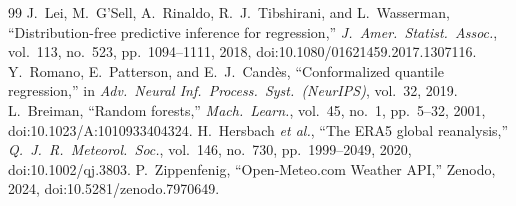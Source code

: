 \documentclass[conference]{IEEEtran}
\begin{document}
\begin{thebibliography}{99}
 J.~Lei, M.~G'Sell, A.~Rinaldo, R.~J.~Tibshirani, and L.~Wasserman, ``Distribution-free predictive inference for regression,'' \emph{J.\ Amer.\ Statist.\ Assoc.}, vol.~113, no.~523, pp.~1094--1111, 2018, doi:10.1080/01621459.2017.1307116.
 Y.~Romano, E.~Patterson, and E.~J.~Cand\`es, ``Conformalized quantile regression,'' in \emph{Adv.\ Neural Inf.\ Process.\ Syst.\ (NeurIPS)}, vol.~32, 2019.
 L.~Breiman, ``Random forests,'' \emph{Mach.\ Learn.}, vol.~45, no.~1, pp.~5--32, 2001, doi:10.1023/A:1010933404324.
 H.~Hersbach \emph{et al.}, ``The ERA5 global reanalysis,'' \emph{Q.\ J.\ R.\ Meteorol.\ Soc.}, vol.~146, no.~730, pp.~1999--2049, 2020, doi:10.1002/qj.3803.
 P.~Zippenfenig, ``Open-Meteo.com Weather API,'' Zenodo, 2024, doi:10.5281/zenodo.7970649.
\end{thebibliography}
\end{document}
